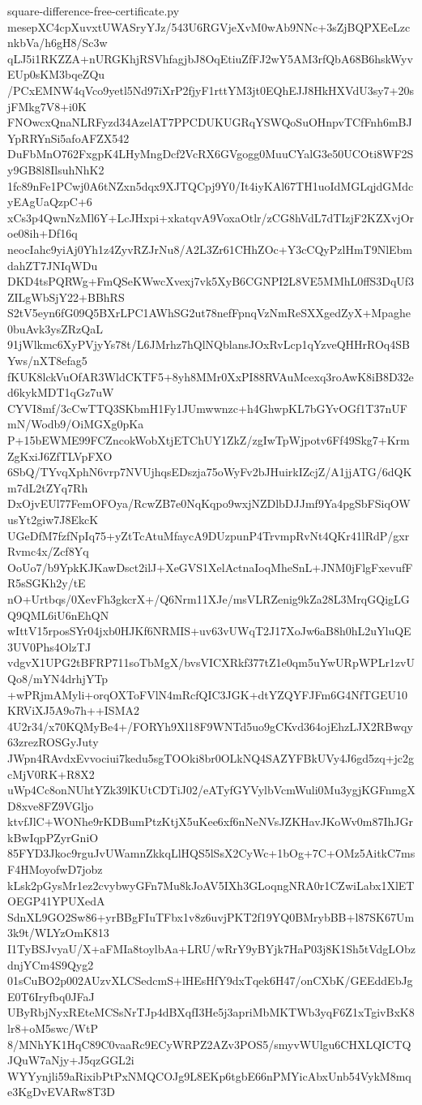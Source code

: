 \documentclass[11pt]{article}
\theoremstyle{definition}
\theoremstyle{remark}
\begin{document}
\begin{filecontents*}[overwrite]{square-difference-free-certificate.py}
mesepXC4cpXuvxtUWASryYJz/543U6RGVjeXvM0wAb9NNc+3sZjBQPXEeLzcnkbVa/h6gH8/Sc3w
qLJ5i1RKZZA+nURGKhjRSVhfagjbJ8OqEtiuZfFJ2wY5AM3rfQbA68B6hskWyvEUp0sKM3bqeZQu
/PCxEMNW4qVco9yetl5Nd97iXrP2fjyF1rttYM3jt0EQhEJJ8HkHXVdU3sy7+20sjFMkg7V8+i0K
FNOwcxQnaNLRFyzd34AzelAT7PPCDUKUGRqYSWQoSuOHnpvTCfFnh6mBJYpRRYnSi5afoAFZX542
DuFbMnO762FxgpK4LHyMngDcf2VcRX6GVgogg0MuuCYalG3e50UCOti8WF2Sy9GB8l8IlsuhNhK2
1fc89nFe1PCwj0A6tNZxn5dqx9XJTQCpj9Y0/It4iyKAl67TH1uoIdMGLqjdGMdcyEAgUaQzpC+6
xCs3p4QwnNzMl6Y+LcJHxpi+xkatqvA9VoxaOtlr/zCG8hVdL7dTIzjF2KZXvjOroe08ih+Df16q
neocIahc9yiAj0Yh1z4ZyvRZJrNu8/A2L3Zr61CHhZOc+Y3cCQyPzlHmT9NlEbmdahZT7JNIqWDu
DKD4tsPQRWg+FmQSeKWwcXvexj7vk5XyB6CGNPI2L8VE5MMhL0ffS3DqUf3ZILgWbSjY22+BBhRS
S2tV5eyn6fG09Q5BXrLPC1AWhSG2ut78nefFpnqVzNmReSXXgedZyX+Mpaghe0buAvk3ysZRzQaL
91jWlkmc6XyPVjyYs78t/L6JMrhz7hQlNQblansJOxRvLcp1qYzveQHHrROq4SBYws/nXT8efag5
fKUK8lckVuOfAR3WldCKTF5+8yh8MMr0XxPI88RVAuMcexq3roAwK8iB8D32ed6kykMDT1qGz7uW
CYVI8mf/3cCwTTQ3SKbmH1Fy1JUmwwnzc+h4GhwpKL7bGYvOGf1T37nUFmN/Wodb9/OiMGXg0pKa
P+15bEWME99FCZncokWobXtjETChUY1ZkZ/zgIwTpWjpotv6Ff49Skg7+KrmZgKxiJ6ZfTLVpFXO
6SbQ/TYvqXphN6vrp7NVUjhqsEDszja75oWyFv2bJHuirkIZcjZ/A1jjATG/6dQKm7dL2tZYq7Rh
DxOjvEUl77FemOFOya/RcwZB7e0NqKqpo9wxjNZDlbDJJmf9Ya4pgSbFSiqOWusYt2giw7J8EkcK
UGeDfM7fzfNpIq75+yZtTcAtuMfaycA9DUzpunP4TrvmpRvNt4QKr41lRdP/gxrRvmc4x/Zcf8Yq
OoUo7/b9YpkKJKawDsct2ilJ+XeGVS1XelActnaIoqMheSnL+JNM0jFlgFxevufFR5sSGKh2y/tE
nO+Urtbqs/0XevFh3gkcrX+/Q6Nrm11XJe/msVLRZenig9kZa28L3MrqGQigLGQ9QML6iU6nEhQN
wIttV15rposSYr04jxb0HJKf6NRMIS+uv63vUWqT2J17XoJw6aB8h0hL2uYluQE3UV0Phs4OlzTJ
vdgvX1UPG2tBFRP711soTbMgX/bvsVICXRkf377tZ1e0qm5uYwURpWPLr1zvUQo8/mYN4drhjYTp
+wPRjmAMyli+orqOXToFVlN4mRcfQIC3JGK+dtYZQYFJFm6G4NfTGEU10KRViXJ5A9o7h++ISMA2
4U2r34/x70KQMyBe4+/FORYh9Xl18F9WNTd5uo9gCKvd364ojEhzLJX2RBwqy63zrezROSGyJuty
JWpn4RAvdxEvvociui7kedu5sgTOOki8br0OLkNQ4SAZYFBkUVy4J6gd5zq+jc2gcMjV0RK+R8X2
uWp4Cc8onNUhtYZk39lKUtCDTiJ02/eATyfGYVylbVcmWuli0Mu3ygjKGFnmgXD8xve8FZ9VGljo
ktvfJlC+WONhe9rKDBumPtzKtjX5uKee6xf6nNeNVsJZKHavJKoWv0m87IhJGrkBwIqpPZyrGniO
85FYD3Jkoc9rguJvUWamnZkkqLlHQS5lSsX2CyWc+1bOg+7C+OMz5AitkC7msF4HMoyofwD7jobz
kLsk2pGysMr1ez2cvybwyGFn7Mu8kJoAV5IXh3GLoqngNRA0r1CZwiLabx1XlETOEGP41YPUXedA
SdnXL9GO2Sw86+yrBBgFIuTFbx1v8z6uvjPKT2f19YQ0BMrybBB+l87SK67Um3k9t/WLYzOmK813
I1TyBSJvyaU/X+aFMIa8toylbAa+LRU/wRrY9yBYjk7HaP03j8K1Sh5tVdgLObzdnjYCm4S9Qyg2
01sCuBO2p002AUzvXLCSedcmS+lHEsHfY9dxTqek6H47/onCXbK/GEEddEbJgE0T6Iryfbq0JFaJ
UByRbjNyxREteMCSsNrTJp4dBXqfI3He5j3apriMbMKTWb3yqF6Z1xTgivBxK8lr8+oM5swc/WtP
8/MNhYK1HqC89C0vaaRc9ECyWRPZ2AZv3POS5/smyvWUlgu6CHXLQICTQJQuW7aNjy+J5qzGGL2i
WYYynjli59aRixibPtPxNMQCOJg9L8EKp6tgbE66nPMYicAbxUnb54VykM8mqe3KgDvEVARw8T3D

\end{filecontents*}
\end{document}
